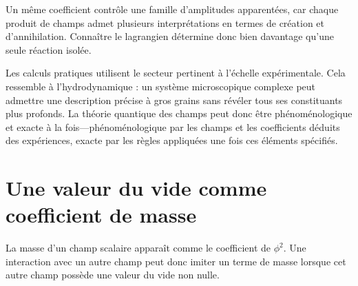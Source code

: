 Un même coefficient contrôle une famille d’amplitudes apparentées, car chaque produit de champs admet plusieurs interprétations en termes de création et d’annihilation. Connaître le lagrangien détermine donc bien davantage qu’une seule réaction isolée.

\begin{classroomqa}
\end{classroomqa}

Les calculs pratiques utilisent le secteur pertinent à l’échelle expérimentale. Cela ressemble à l’hydrodynamique : un système microscopique complexe peut admettre une description précise à gros grains sans révéler tous ses constituants plus profonds. La théorie quantique des champs peut donc être phénoménologique et exacte à la fois---phénoménologique par les champs et les coefficients déduits des expériences, exacte par les règles appliquées une fois ces éléments spécifiés.

\begin{classroomqa}
\end{classroomqa}

\section{Une valeur du vide comme coefficient de masse}

La masse d’un champ scalaire apparaît comme le coefficient de \(\phi^2\). Une interaction avec un autre champ peut donc imiter un terme de masse lorsque cet autre champ possède une valeur du vide non nulle.

